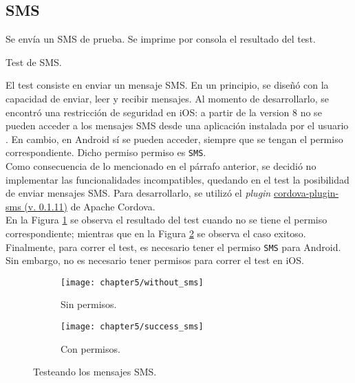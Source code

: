 \subsection{SMS}
\begin{algorithm}
	\begin{algorithmic}[1]
		\STATE Se envía un SMS de prueba.
		\STATE Se imprime por consola el resultado del test.
	\end{algorithmic}
	\caption{Test de SMS.}
	\label{alg:chap5_test_sms}
\end{algorithm}
El test consiste en enviar un mensaje SMS. En un principio, se diseñó con la capacidad de enviar, leer y recibir mensajes. Al momento de desarrollarlo, se encontró una restricción de seguridad en iOS: a partir de la version 8 no se pueden acceder a los mensajes SMS desde una aplicación instalada por el usuario \cite{foda, foda2}. En cambio, en Android sí se pueden acceder, siempre que se tengan el permiso correspondiente. Dicho permiso permiso es \texttt{SMS}.\\

Como consecuencia de lo mencionado en el párrafo anterior, se decidió no implementar las funcionalidades incompatibles, quedando en el test la posibilidad de enviar mensajes SMS. Para desarrollarlo, se utilizó el \textit{plugin} \href{https://github.com/floatinghotpot/cordova-plugin-sms}{cordova-plugin-sms (v. 0.1.11)} de Apache Cordova.\\

En la Figura \ref{fig:ch05:without_sms} se observa el resultado del test cuando no se tiene el permiso correspondiente; mientras que en la Figura \ref{fig:ch05:with_sms} se observa el caso exitoso.\\
Finalmente, para correr el test, es necesario tener el permiso \texttt{SMS} para Android. Sin embargo, no es necesario tener permisos para correr el test en iOS.
\begin{figure}[hbtp]
    \centering
	\begin{subfigure}{.3\linewidth}
		\texttt{[image: chapter5/without\_sms]}
		\caption{Sin permisos.}
		\label{fig:ch05:without_sms}
	\end{subfigure}
	\begin{subfigure}{.3\linewidth}
	    \centering
		\texttt{[image: chapter5/success\_sms]}
		\caption{Con permisos.}
		\label{fig:ch05:with_sms}
	\end{subfigure}
	\caption{Testeando los mensajes SMS.}
	\label{fig:chapter05:sms_test}
\end{figure}
